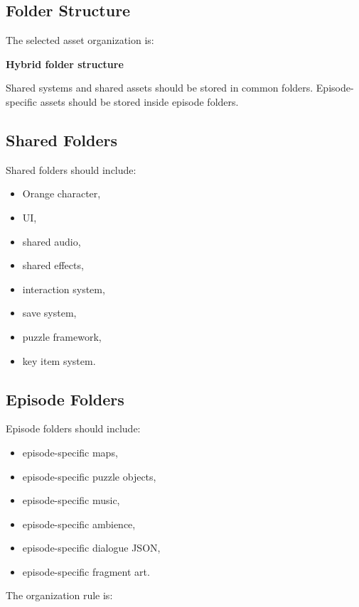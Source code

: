 \documentclass[12pt]{article}
\begin{document}
\subsection{Folder Structure}

The selected asset organization is:

\begin{center}
\textbf{Hybrid folder structure}
\end{center}

Shared systems and shared assets should be stored in common folders. Episode-specific assets should be stored inside episode folders.

\subsection{Shared Folders}

Shared folders should include:

\begin{itemize}[leftmargin=*]
    \item Orange character,
    \item UI,
    \item shared audio,
    \item shared effects,
    \item interaction system,
    \item save system,
    \item puzzle framework,
    \item key item system.
\end{itemize}

\subsection{Episode Folders}

Episode folders should include:

\begin{itemize}[leftmargin=*]
    \item episode-specific maps,
    \item episode-specific puzzle objects,
    \item episode-specific music,
    \item episode-specific ambience,
    \item episode-specific dialogue JSON,
    \item episode-specific fragment art.
\end{itemize}

The organization rule is:
\end{document}
